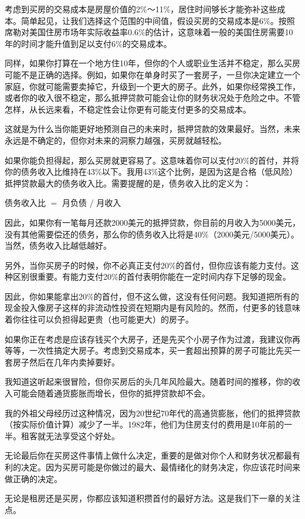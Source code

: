 考虑到买房的交易成本是房屋价值的2\%～11\%，居住时间够长才能弥补这些成本。简单起见，让我们选择这个范围的中间值，假设买房的交易成本是6\%。按照席勒对美国住房市场年实际收益率0.6\%的估计，这意味着一般的美国住房需要10年的时间才能升值到足以支付6\%的交易成本。

同样，如果你打算在一个地方住10年，但你的个人或职业生活并不稳定，那么买房可能不是正确的选择。例如，如果你在单身时买了一套房子，一旦你决定建立一个家庭，你就可能需要卖掉它，升级到一个更大的房子。此外，如果你经常换工作，或者你的收入很不稳定，那么抵押贷款可能会让你的财务状况处于危险之中。不管怎样，从长远来看，不稳定性会让你更有可能支付更多的交易成本。

这就是为什么当你能更好地预测自己的未来时，抵押贷款的效果最好。当然，未来永远是不确定的，但你对未来的洞察力越强，买房就越轻松。

如果你能负担得起，那么买房就更容易了。这意味着你可以支付20\%的首付，并将你的债务收入比维持在43\%以下。我用43\%这个比例，是因为这是合格（低风险）抵押贷款最大的债务收入比。需要提醒的是，债务收入比的定义为：

债务收入比 $=$ 月负债 / 月收入

因此，如果你有一笔每月还款2000美元的抵押贷款，你目前的月收入为5000美元，没有其他需要偿还的债务，那么你的债务收入比将是40\%（2000美元/5000美元）。当然，债务收入比越低越好。

另外，当你买房子的时候，你不必真正支付20\%的首付，但你应该有能力支付。这种区别很重要。有能力支付20\%的首付表明你能在一定时间内存下足够的现金。

因此，你如果能拿出20\%的首付，但不这么做，这没有任何问题。我知道把所有的现金投入像房子这样的非流动性投资在短期内是有风险的。然而，付更多的钱意味着你往往可以负担得起更贵（也可能更大）的房子。

如果你正在考虑是应该存钱买个大房子，还是先买个小房子作为过渡，我建议你再等等，一次性搞定大房子。考虑到交易成本，买一套超出预算的房子可能比先买一套房子然后在几年内卖掉要好。

我知道这听起来很冒险，但你买房后的头几年风险最大。随着时间的推移，你的收入可能会随着通货膨胀而增长，但你的抵押贷款却不会。

我的外祖父母经历过这种情况，因为20世纪70年代的高通货膨胀，他们的抵押贷款（按实际价值计算）减少了一半。1982年，他们为住房支付的费用是10年前的一半。租客就无法享受这个好处。

无论最后你在买房这件事情上做什么决定，重要的是做对你个人和财务状况都最有利的决定。因为买房可能是你做过的最大、最情绪化的财务决定，你应该花时间来做正确的决定。

无论是租房还是买房，你都应该知道积攒首付的最好方法。这是我们下一章的关注点。

